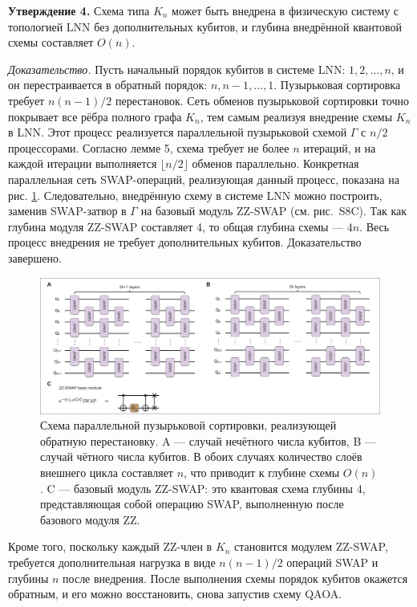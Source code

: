 \textbf{Утверждение 4.} Схема типа $K_n$ может быть внедрена в физическую
систему с топологией LNN без дополнительных кубитов, и глубина внедрённой
квантовой схемы составляет $O(n)$.

\textit{Доказательство.} Пусть начальный порядок кубитов в системе LNN: $1, 2,
\dots, n$, и он перестраивается в обратный порядок: $n, n-1, \dots, 1$.
Пузырьковая сортировка требует $n(n-1)/2$ перестановок. Сеть обменов
пузырьковой сортировки точно покрывает все рёбра полного графа $K_n$, тем самым
реализуя внедрение схемы $K_n$ в LNN. Этот процесс реализуется параллельной
пузырьковой схемой $\Gamma$ с $n/2$ процессорами. Согласно лемме 5, схема
требует не более $n$ итераций, и на каждой итерации выполняется $\lfloor n/2
\rfloor$ обменов параллельно. Конкретная параллельная сеть SWAP-операций,
реализующая данный процесс, показана на рис. \ref{fig:fig12}. Следовательно,
внедрённую схему в системе LNN можно построить, заменив SWAP-затвор в $\Gamma$
на базовый модуль ZZ-SWAP (см. рис.~S8C). Так как глубина модуля ZZ-SWAP
составляет 4, то общая глубина схемы — $4n$. Весь процесс внедрения не требует
дополнительных кубитов. Доказательство завершено.

\begin{figure}
    \centering
    \includegraphics[scale=0.35]{inc/fig_12.png}
    \caption{
    Схема параллельной пузырьковой сортировки, реализующей обратную
    перестановку. A — случай нечётного числа кубитов, B — случай чётного числа
    кубитов. В обоих случаях количество слоёв внешнего цикла составляет $n$,
    что приводит к глубине схемы $O(n)$. C — базовый модуль ZZ-SWAP: это
    квантовая схема глубины 4, представляющая собой операцию SWAP, выполненную
    после базового модуля ZZ.
    }
    \label{fig:fig12}
\end{figure}

Кроме того, поскольку каждый ZZ-член в $K_n$ становится модулем ZZ-SWAP,
требуется дополнительная нагрузка в виде $n(n-1)/2$ операций SWAP и глубины $n$
после внедрения. После выполнения схемы порядок кубитов окажется обратным, и
его можно восстановить, снова запустив схему QAOA.


